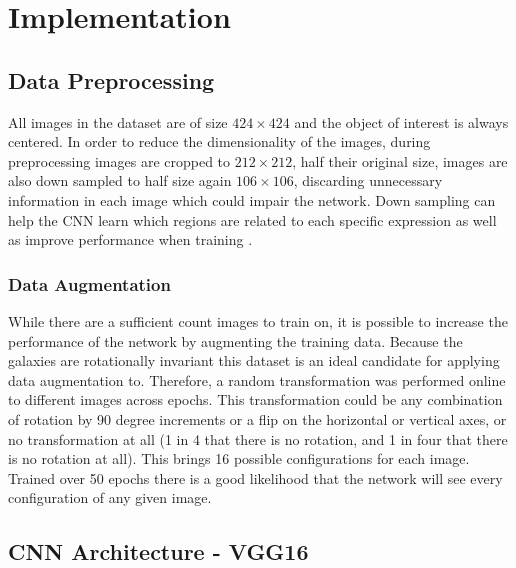 \section{Implementation}


\subsection{Data Preprocessing}

All images in the dataset are of size $424\times424$ and the object of interest is always centered. In order to reduce the dimensionality of the images, during preprocessing images are cropped to $212\times212$, half their original size, images are also down sampled to half size again $ 106\times 106$, discarding unnecessary information in each image which could impair the network. Down sampling can help the CNN learn which regions are related to each specific expression as well as improve performance when training \cite{deep-learning-review}.

\subsubsection{Data Augmentation}
While there are a sufficient count images to train on, it is possible to increase the performance of the network by augmenting the training data. Because the galaxies are rotationally invariant this dataset is an ideal candidate for applying data augmentation to. Therefore, a random transformation was performed online to different images across epochs. This transformation could be any combination of rotation by 90 degree increments or a flip on the horizontal or vertical axes, or no transformation at all (1 in 4 that there is no rotation, and 1 in four that there is no rotation at all). This brings 16 possible configurations for each image. Trained over 50 epochs there is a good likelihood that the network will see every configuration of any given image.

\subsection{CNN Architecture - VGG16}

\newcommand{\anet}{AlexNet\xspace}
\newcommand{\gnet}{GoogLeNet\xspace}
\newcommand{\inet}{ImageNet\xspace}

